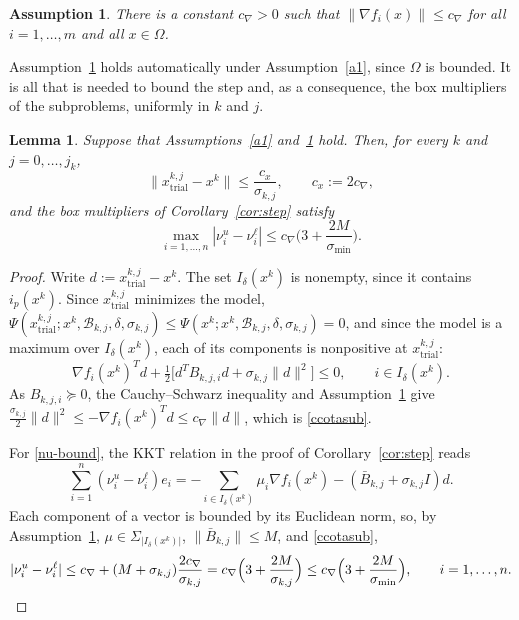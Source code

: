 \documentclass[11pt]{article}
\newcommand{\xkjtrial}{x^{k,j}_{\mathrm{trial}}}
\newtheorem{lemma}[theorem]{Lemma}
\newtheorem{assumption}{Assumption}
\begin{document}
\begin{assumption} \label{a3}
There is a constant $c_\nabla > 0$ such that $\|\nabla f_i(x)\| \leq c_\nabla$
for all $i = 1, \ldots, m$ and all $x \in \Omega$.
\end{assumption}

Assumption~\ref{a3} holds automatically under Assumption~\ref{a1}, since
$\Omega$ is bounded. It is all that is needed to bound the step and, as a
consequence, the box multipliers of the subproblems, uniformly in $k$ and $j$.

\begin{lemma} \label{lem:step}
Suppose that Assumptions~\ref{a1} and~\ref{a3} hold. Then, for every $k$ and
$j = 0, \ldots, j_k$,
\begin{equation} \label{ccotasub}
\|\xkjtrial - x^k\| \leq \frac{c_x}{\sigma_{k,j}}, \qquad
c_x := 2c_\nabla,
\end{equation}
and the box multipliers of Corollary~\ref{cor:step} satisfy
\begin{equation} \label{nu-bound}
\max_{i = 1, \ldots, n} |\nu^u_i - \nu^\ell_i|
\leq c_\nabla \Big( 3 + \frac{2M}{\sigma_{\min}} \Big).
\end{equation}
\end{lemma}

\begin{proof}
Write $d := \xkjtrial - x^k$. The set $I_\delta(x^k)$ is nonempty, since it
contains $i_p(x^k)$. Since $\xkjtrial$ minimizes the model,
$\Psi(\xkjtrial; x^k, \mathcal{B}_{k,j}, \delta, \sigma_{k,j}) \leq
\Psi(x^k; x^k, \mathcal{B}_{k,j}, \delta, \sigma_{k,j}) = 0$, and since the model
is a maximum over $I_\delta(x^k)$, each of its components is nonpositive at
$\xkjtrial$:
\[
\nabla f_i(x^k)^T d + \tfrac{1}{2} \big[ d^T B_{k,j,i} d + \sigma_{k,j}\|d\|^2 \big]
\leq 0, \qquad i \in I_\delta(x^k).
\]
As $B_{k,j,i} \succeq 0$, the Cauchy--Schwarz inequality and
Assumption~\ref{a3} give
$\tfrac{\sigma_{k,j}}{2}\|d\|^2 \leq -\nabla f_i(x^k)^T d \leq c_\nabla \|d\|$,
which is \eqref{ccotasub}.

For \eqref{nu-bound}, the KKT relation in the proof of
Corollary~\ref{cor:step} reads
\[
\sum_{i=1}^n (\nu^u_i - \nu^\ell_i) e_i
= - \sum_{i \in I_\delta(x^k)} \mu_i \nabla f_i(x^k)
- (\bar{B}_{k,j} + \sigma_{k,j} I) d .
\]
Each component of a vector is bounded by its Euclidean norm, so, by
Assumption~\ref{a3}, $\mu \in \Sigma_{|I_\delta(x^k)|}$,
$\|\bar{B}_{k,j}\| \leq M$, and \eqref{ccotasub},
\[
|\nu^u_i - \nu^\ell_i|
\leq c_\nabla + (M + \sigma_{k,j}) \frac{2c_\nabla}{\sigma_{k,j}}
= c_\nabla \Big( 3 + \frac{2M}{\sigma_{k,j}} \Big)
\leq c_\nabla \Big( 3 + \frac{2M}{\sigma_{\min}} \Big),
\qquad i = 1, \ldots, n. \qedhere
\]
\end{proof}
\end{document}
